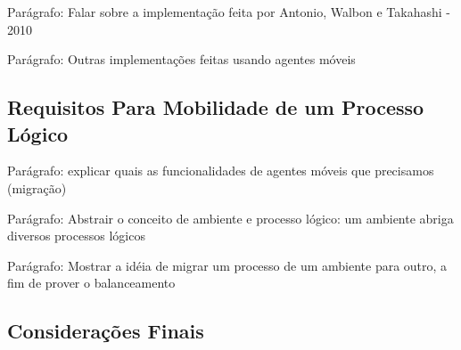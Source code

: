 Parágrafo: Falar sobre a implementação feita por Antonio, Walbon e Takahashi - 2010

Parágrafo: Outras implementações feitas usando agentes móveis

\subsection{Requisitos Para Mobilidade de um Processo Lógico}

Parágrafo: explicar quais as funcionalidades de agentes móveis que precisamos (migração)

Parágrafo: Abstrair o conceito de ambiente e processo lógico: um ambiente abriga diversos processos lógicos

Parágrafo: Mostrar a idéia de migrar um processo de um ambiente para outro, a fim de prover o balanceamento

\subsection{Considerações Finais}

